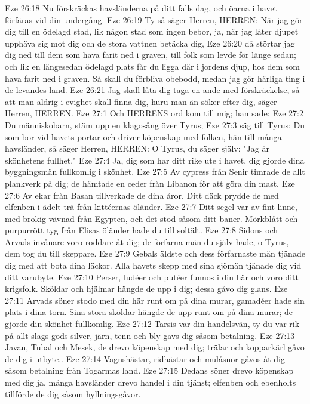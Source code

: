 Eze 26:18  Nu förskräckas havsländerna på ditt falls dag, och öarna i havet förfäras vid din undergång.
Eze 26:19  Ty så säger Herren, HERREN: När jag gör dig till en ödelagd stad, lik någon stad som ingen bebor, ja, när jag låter djupet upphäva sig mot dig och de stora vattnen betäcka dig,
Eze 26:20  då störtar jag dig ned till dem som hava farit ned i graven, till folk som levde för länge sedan; och lik en längesedan ödelagd plats får du ligga där i jordens djup, hos dem som hava farit ned i graven. Så skall du förbliva obebodd, medan jag gör härliga ting i de levandes land.
Eze 26:21  Jag skall låta dig taga en ande med förskräckelse, så att man aldrig i evighet skall finna dig, huru man än söker efter dig, säger Herren, HERREN.
Eze 27:1  Och HERRENS ord kom till mig; han sade:
Eze 27:2  Du människobarn, stäm upp en klagosång över Tyrus;
Eze 27:3  säg till Tyrus: Du som bor vid havets portar och driver köpenskap med folken, hän till många havsländer, så säger Herren, HERREN: O Tyrus, du säger själv: "Jag är skönhetens fullhet."
Eze 27:4  Ja, dig som har ditt rike ute i havet, dig gjorde dina byggningsmän fullkomlig i skönhet.
Eze 27:5  Av cypress från Senir timrade de allt plankverk på dig; de hämtade en ceder från Libanon för att göra din mast.
Eze 27:6  Av ekar från Basan tillverkade de dina åror. Ditt däck prydde de med elfenben i ädelt trä från kittéernas öländer.
Eze 27:7  Ditt segel var av fint linne, med brokig vävnad från Egypten, och det stod såsom ditt baner. Mörkblått och purpurrött tyg från Elisas öländer hade du till soltält.
Eze 27:8  Sidons och Arvads invånare voro roddare åt dig; de förfarna män du själv hade, o Tyrus, dem tog du till skeppare.
Eze 27:9  Gebals äldste och dess förfarnaste män tjänade dig med att bota dina läckor. Alla havets skepp med sina sjömän tjänade dig vid ditt varubyte.
Eze 27:10  Perser, ludéer och putéer funnos i din här och voro ditt krigsfolk. Sköldar och hjälmar hängde de upp i dig; dessa gåvo dig glans.
Eze 27:11  Arvads söner stodo med din här runt om på dina murar, gamadéer hade sin plats i dina torn. Sina stora sköldar hängde de upp runt om på dina murar; de gjorde din skönhet fullkomlig.
Eze 27:12  Tarsis var din handelsvän, ty du var rik på allt slags gods silver, järn, tenn och bly gavs dig såsom betalning.
Eze 27:13  Javan, Tubal och Mesek, de drevo köpenskap med dig; trälar och kopparkärl gåvo de dig i utbyte..
Eze 27:14  Vagnshästar, ridhästar och mulåsnor gåvos åt dig såsom betalning från Togarmas land.
Eze 27:15  Dedans söner drevo köpenskap med dig ja, många havsländer drevo handel i din tjänst; elfenben och ebenholts tillförde de dig såsom hyllningsgåvor.
